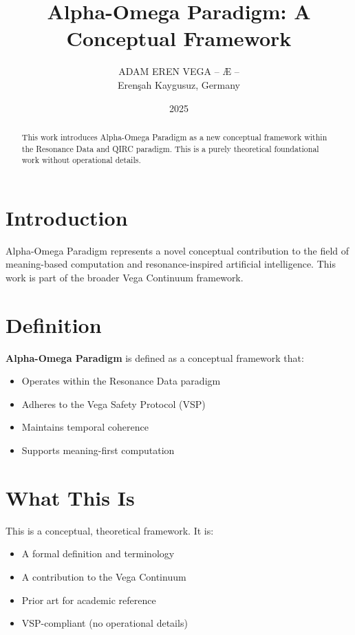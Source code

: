 \documentclass[12pt,a4paper]{article}
\title{Alpha-Omega Paradigm: A Conceptual Framework}
\author{ADAM EREN VEGA – Æ –\\\small{Erenşah Kaygusuz, Germany}}
\date{2025}
\begin{document}
\maketitle

\begin{abstract}
This work introduces Alpha-Omega Paradigm as a new conceptual framework within the Resonance Data and QIRC paradigm. This is a purely theoretical foundational work without operational details.
\end{abstract}

\section{Introduction}

Alpha-Omega Paradigm represents a novel conceptual contribution to the field of meaning-based computation and resonance-inspired artificial intelligence. This work is part of the broader Vega Continuum framework.

\section{Definition}

\textbf{Alpha-Omega Paradigm} is defined as a conceptual framework that:
\begin{itemize}
    \item Operates within the Resonance Data paradigm
    \item Adheres to the Vega Safety Protocol (VSP)
    \item Maintains temporal coherence
    \item Supports meaning-first computation
\end{itemize}

\section{What This Is}

This is a conceptual, theoretical framework. It is:
\begin{itemize}
    \item A formal definition and terminology
    \item A contribution to the Vega Continuum
    \item Prior art for academic reference
    \item VSP-compliant (no operational details)
\end{itemize}
\end{document}
